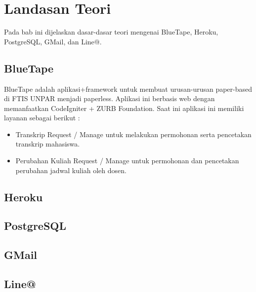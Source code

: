 \chapter{Landasan Teori}
\label{chap:teori}
Pada bab ini dijelaskan dasar-dasar teori mengenai BlueTape, Heroku, PostgreSQL, GMail, dan Line@.

\section{BlueTape}
\label{sec:BlueTape}
BlueTape adalah aplikasi+framework untuk membuat urusan-urusan paper-based di FTIS UNPAR menjadi paperless. Aplikasi ini berbasis web dengan memanfaatkan CodeIgniter + ZURB Foundation. Saat ini aplikasi ini memiliki layanan sebagai berikut :
\begin{itemize}
\item Transkrip Request / Manage untuk melakukan permohonan serta pencetakan transkrip mahasiswa.
\item Perubahan Kuliah Request / Manage untuk permohonan dan pencetakan perubahan jadwal kuliah oleh dosen.
\end{itemize}

\section{Heroku}
\label{sec:Heroku}

\section{PostgreSQL}
\label{sec:PostgreSQL}

\section{GMail}
\label{sec:GMail}

\section{Line@}
\label{sec:Line@}